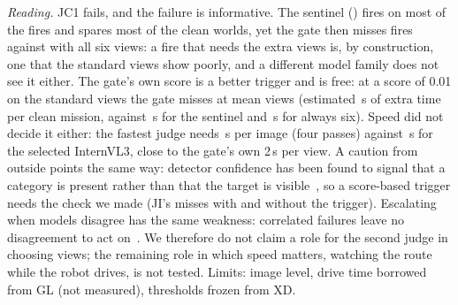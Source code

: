 \emph{Reading.} JC1 fails, and the failure is informative. The sentinel (\JCPrimary{}) fires on most of the fires and spares most of the clean worlds, yet the gate then misses \JCSentMiss{} fires against \JCSixMiss{} with all six views: a fire that needs the extra views is, by construction, one that the standard views show poorly, and a different model family does not see it either. The gate's own score is a better trigger and is free: at a score of 0.01 on the standard views the gate misses \JCOwnMiss{} at \JCOwnViews{} mean views (estimated \JCOwnSecs\,s of extra time per clean mission, against \JCSentSecs\,s for the sentinel and \JCSixSecs\,s for always six). Speed did not decide it either: the fastest judge needs \JCLatSent\,s per image (four passes) against \JCLatIntern\,s for the selected InternVL3, close to the gate's own 2\,s per view. A caution from outside points the same way: detector confidence has been found to signal that a category is present rather than that the target is visible~\cite{he2026detector}, so a score-based trigger needs the check we made (JI's misses with and without the trigger). Escalating when models disagree has the same weakness: correlated failures leave no disagreement to act on~\cite{mcdonnell2026agreement}. We therefore do not claim a role for the second judge in choosing views; the remaining role in which speed matters, watching the route while the robot drives, is not tested. Limits: image level, drive time borrowed from GL (not measured), thresholds frozen from XD.

